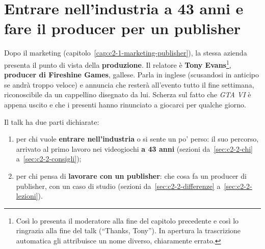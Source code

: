 
\chapter[Il producer di un publisher]{Entrare nell'industria a 43 anni e fare il
producer per un publisher}
\label{cap:c2-2-producer}

Dopo il marketing (capitolo~\ref{cap:c2-1-marketing-publisher}), la stessa azienda
presenta il punto di vista della \textbf{produzione}. Il relatore è \textbf{Tony
Evans}\footnote{Così lo presenta il moderatore alla fine del capitolo precedente e
così lo ringrazia alla fine del talk (``Thanks, Tony''). In apertura la
trascrizione automatica gli attribuisce un nome diverso, chiaramente
errato.}, \textbf{producer di Fireshine Games}, gallese. Parla in inglese
(scusandosi in anticipo se andrà troppo veloce) e annuncia che resterà all'evento
tutto il fine settimana, riconoscibile da un cappellino disegnato da lui. Scherza
sul fatto che \emph{GTA VI} è appena uscito e che i presenti hanno rinunciato a
giocarci per qualche giorno.

Il talk ha due parti dichiarate:
\begin{enumerate}
  \item per chi vuole \textbf{entrare nell'industria} o si sente un po' perso: il
        suo percorso, arrivato al primo lavoro nei videogiochi \textbf{a 43 anni}
        (sezioni da~\ref{sec:c2-2-chi} a~\ref{sec:c2-2-consigli});
  \item per chi pensa di \textbf{lavorare con un publisher}: che cosa fa un
        producer di publisher, con un caso di studio (sezioni
        da~\ref{sec:c2-2-differenze} a~\ref{sec:c2-2-lezioni}).
\end{enumerate}

